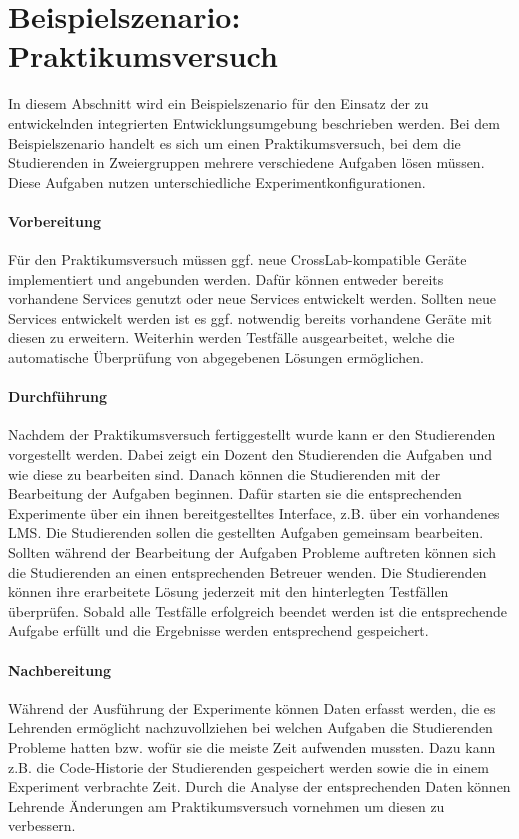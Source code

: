 \section{Beispielszenario: Praktikumsversuch}\label{section:anforderungsanalyse:beispielszenario}

In diesem Abschnitt wird ein Beispielszenario für den Einsatz der zu entwickelnden integrierten Entwicklungsumgebung beschrieben werden. Bei dem Beispielszenario handelt es sich um einen Praktikumsversuch, bei dem die Studierenden in Zweiergruppen mehrere verschiedene Aufgaben lösen müssen. Diese Aufgaben nutzen unterschiedliche Experimentkonfigurationen.

\paragraph{Vorbereitung}
Für den Praktikumsversuch müssen ggf. neue CrossLab-kompatible Geräte implementiert und angebunden werden. Dafür können entweder bereits vorhandene Services genutzt oder neue Services entwickelt werden. Sollten neue Services entwickelt werden ist es ggf. notwendig bereits vorhandene Geräte mit diesen zu erweitern. Weiterhin werden Testfälle ausgearbeitet, welche die automatische Überprüfung von abgegebenen Lösungen ermöglichen.

\paragraph{Durchführung}
Nachdem der Praktikumsversuch fertiggestellt wurde kann er den Studierenden vorgestellt werden. Dabei zeigt ein Dozent den Studierenden die Aufgaben und wie diese zu bearbeiten sind. Danach können die Studierenden mit der Bearbeitung der Aufgaben beginnen. Dafür starten sie die entsprechenden Experimente über ein ihnen bereitgestelltes Interface, z.B. über ein vorhandenes \ac{LMS}. Die Studierenden sollen die gestellten Aufgaben gemeinsam bearbeiten. Sollten während der Bearbeitung der Aufgaben Probleme auftreten können sich die Studierenden an einen entsprechenden Betreuer wenden. Die Studierenden können ihre erarbeitete Lösung jederzeit mit den hinterlegten Testfällen überprüfen. Sobald alle Testfälle erfolgreich beendet werden ist die entsprechende Aufgabe erfüllt und die Ergebnisse werden entsprechend gespeichert.

\paragraph{Nachbereitung}
Während der Ausführung der Experimente können Daten erfasst werden, die es Lehrenden ermöglicht nachzuvollziehen bei welchen Aufgaben die Studierenden Probleme hatten bzw. wofür sie die meiste Zeit aufwenden mussten. Dazu kann z.B. die Code-Historie der Studierenden gespeichert werden sowie die in einem Experiment verbrachte Zeit. Durch die Analyse der entsprechenden Daten können Lehrende Änderungen am Praktikumsversuch vornehmen um diesen zu verbessern.
